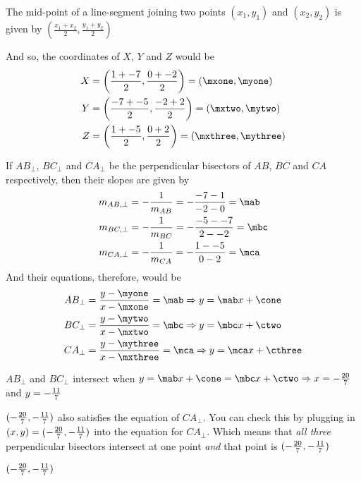 \watchout

\begin{solution}[\fullpage]
	
		The mid-point of a line-segment joining two points $(x_1, y_1)$ and $(x_2, y_2)$ is given 
		by $\left( \frac{x_1 + x_2}{2}, \frac{y_1 + y_2}{2}\right)$
		
		And so, the coordinates of $X$, $Y$ and $Z$ would be 
		\begin{align}
			X &= \left( \frac{\vbone + \vbthree}{2}, \frac{\vbtwo + \vbfour}{2} \right) = (\mxone, \myone) \\
			Y &= \left( \frac{\vbthree + \vbfive}{2}, \frac{\vbfour + \vbsix}{2} \right) = (\mxtwo, \mytwo) \\
			Z &= \left( \frac{\vbone + \vbfive}{2}, \frac{\vbtwo + \vbsix}{2} \right) = (\mxthree, \mythree)
		\end{align}
	
		If $AB_\perp$, $BC_\perp$ and $CA_\perp$ be the perpendicular bisectors of $AB$, $BC$ and $CA$ respectively, then 
		their slopes are given by
		\begin{align}
			m_{AB,\perp} &= -\frac{1}{m_{AB}} = -\dfrac{\vbthree - \vbone}{\vbfour - \vbtwo} = \mab \\
			m_{BC,\perp} &= -\frac{1}{m_{BC}} = -\dfrac{\vbfive - \vbthree}{\vbsix - \vbfour} = \mbc \\
			m_{CA,\perp} &= -\frac{1}{m_{CA}} = -\dfrac{\vbone - \vbfive}{\vbtwo - \vbsix} = \mca
		\end{align}
		And their equations, therefore, would be 
		\begin{align}
			AB_\perp &= \dfrac{y-\myone}{x-\mxone} = \mab \Rightarrow y = \mab x + \cone \\
			BC_\perp &= \dfrac{y-\mytwo}{x-\mxtwo} = \mbc \Rightarrow y = \mbc x + \ctwo \\
			CA_\perp &= \dfrac{y-\mythree}{x-\mxthree} = \mca \Rightarrow y = \mca x + \cthree					
		\end{align}
	
		$AB_\perp$ and $BC_\perp$ intersect when $ y = \mab x + \cone = \mbc x + \ctwo \Rightarrow x = \vbseven$ 
		and $y = -\frac{11}{7}$
		
		$(-\frac{20}{7}, -\frac{11}{7})$ also satisfies the equation of $CA_\perp$. You can check this by plugging in 
		$(x,y) = (-\frac{20}{7}, -\frac{11}{7})$ into the equation for $CA_\perp$. Which means that \textit{all three} 
		perpendicular bisectors intersect at one point \textit{and} that point is $(-\frac{20}{7}, -\frac{11}{7})$
\end{solution}

\ifprintanswers\begin{codex}$(-\frac{20}{7}, -\frac{11}{7})$\end{codex}\fi

